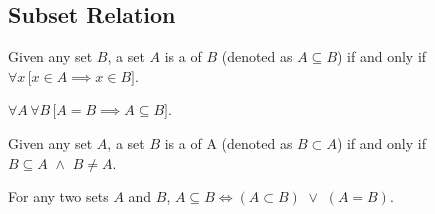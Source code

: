 \subsection{Subset Relation}
\begin{dfn}[Subset]
    \label{dfn:subset}
    Given any set \( B \), a set \( A \) is a  of \( B \) (denoted as \( A \subseteq B \))
    if and only if \( \forall x \, \big[ x \in A {\implies} x \in B \big] \).
\end{dfn}

\begin{cor}
     \label{cor:A-equals-B-implies-A-subset-B}
    \( \forall A \, \forall B \, \big[ A = B {\implies} A \subseteq B \big] \).
\end{cor}

\begin{dfn}
    \label{dfn:proper-subset}
    Given any set \( A \), a set \( B \) is a  of A
    (denoted as \( B \subset A \)) if and only if \( B \subseteq A \,\,{\land}\,\, B \neq A \).
\end{dfn}

\begin{thm}
     \label{thm:subset-in-terms-of-proper-subset}
    For any two sets \( A \) and \( B \), \( A \subseteq B {\iff} (A \subset B) \,\,{\lor}\,\, (A = B) \).
\end{thm}

